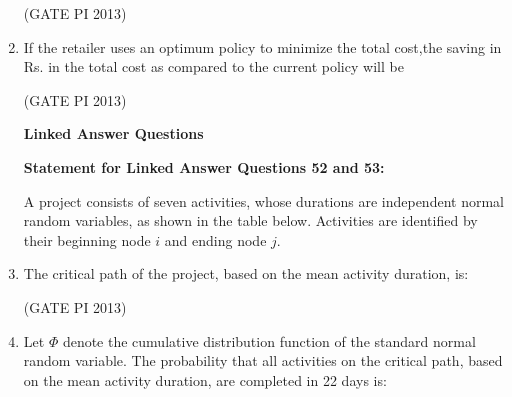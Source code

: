 \documentclass[journal,12pt,onecolumn]{IEEEtran}
\theoremstyle{remark}
\begin{document}
\begin{enumerate}
\hfill (GATE PI 2013)

\item If the retailer uses an optimum policy to minimize the total cost,the saving in Rs. in the total cost as compared to the current policy will be
\begin{enumerate}
\end{enumerate}

\hfill (GATE PI 2013)

\textbf{Linked Answer Questions}

\textbf{Statement for Linked Answer Questions 52 and 53:}  

A project consists of seven activities, whose durations are independent normal random variables, as shown in the table below. Activities are identified by their beginning node $i$ and ending node $j$. \\


\newline
\item The critical path of the project, based on the mean activity duration, is:
\begin{enumerate}
\end{enumerate}

\hfill (GATE PI 2013)

\item Let $\Phi$ denote the cumulative distribution function of the standard normal random variable. The probability that all activities on the critical path, based on the mean activity duration, are completed in 22 days is:
\begin{enumerate}
\end{enumerate}


\end{enumerate}
\end{document}
